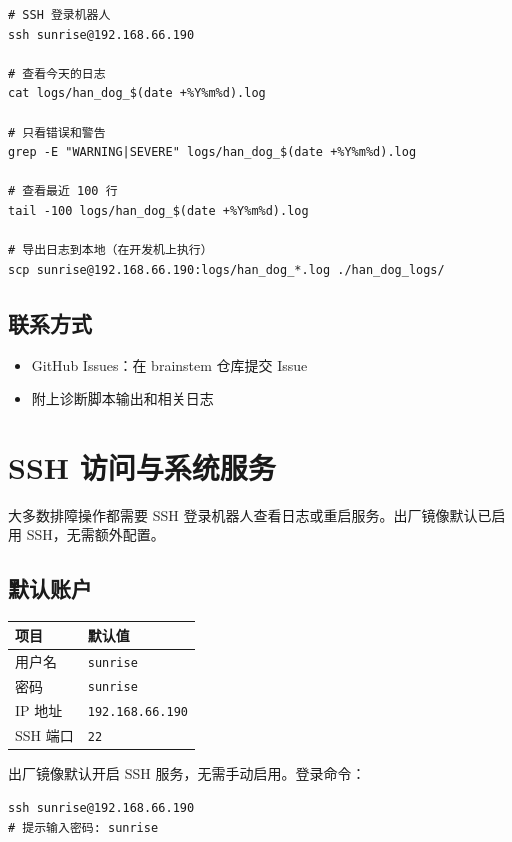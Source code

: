 \documentclass[a4paper,11pt,openany]{book}
\begin{document}
\begin{lstlisting}[style=bash]
# SSH 登录机器人
ssh sunrise@192.168.66.190

# 查看今天的日志
cat logs/han_dog_$(date +%Y%m%d).log

# 只看错误和警告
grep -E "WARNING|SEVERE" logs/han_dog_$(date +%Y%m%d).log

# 查看最近 100 行
tail -100 logs/han_dog_$(date +%Y%m%d).log

# 导出日志到本地（在开发机上执行）
scp sunrise@192.168.66.190:logs/han_dog_*.log ./han_dog_logs/
\end{lstlisting}

\subsection{联系方式}

\begin{itemize}[nosep]
  \item GitHub Issues：在 brainstem 仓库提交 Issue
  \item 附上诊断脚本输出和相关日志
\end{itemize}

\section{SSH 访问与系统服务}
\label{sec:ssh-access}

大多数排障操作都需要 SSH 登录机器人查看日志或重启服务。出厂镜像默认已启用 SSH，无需额外配置。

\subsection{默认账户}

\begin{longtable}{ll}
\toprule
项目 & 默认值 \\
\midrule
\endhead
用户名 & \texttt{sunrise} \\
密码 & \texttt{sunrise} \\
IP 地址 & \texttt{192.168.66.190} \\
SSH 端口 & \texttt{22} \\
\bottomrule
\end{longtable}

\noindent 出厂镜像默认开启 SSH 服务，无需手动启用。登录命令：

\begin{lstlisting}[style=bash]
ssh sunrise@192.168.66.190
# 提示输入密码: sunrise
\end{lstlisting}
\end{document}
